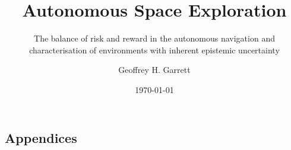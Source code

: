 \documentclass[
    11pt,
]{tudat}
\begin{document}

\title{Autonomous Space Exploration}
\author{Geoffrey H. Garrett}
\subtitle{The balance of risk and reward in the autonomous navigation and characterisation of environments with inherent epistemic uncertainty}
\subject{M.Sc. Literature Review}
\date{\today}

\makecover

\newpage


\thispagestyle{empty}
\mbox{}
\newpage

\frontmatter %

\setlength{\glsdescwidth}{0.9\textwidth}

\printnoidxglossary[type=\acronymtype, title={List of Abbreviations}]



\listoffigures

\listoftables\newpage

\setcounter{tocdepth}{2} %
\tableofcontents


\mainmatter %








% 
% 

\newpage

% 
\printbibliography
\backmatter

\begin{appendices}
    \chapter{Appendices}
    \renewcommand{\thesection}{\Alph{section}}
    \renewcommand\theequation{\Alph{section}.\arabic{equation}}
    
    
    
\end{appendices}
\end{document}
